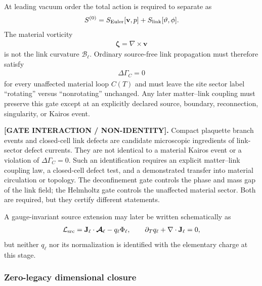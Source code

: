 At leading vacuum order the total action is required to separate as
\begin{align}
    S^{(0)}
    =
    S_{\rm Euler}[\mathbf v,p]
    +
    S_{\rm link}[\vartheta,\phi].
    \label{eq:rt_link_euler_factorization}
\end{align}
The material vorticity
\begin{align}
    \boldsymbol\zeta=\nabla\times\mathbf v
\end{align}
is not the link curvature
$\boldsymbol{\mathcal B}_\ell$.  Ordinary source-free link propagation must
therefore satisfy
\begin{align}
    \Delta\Gamma_C=0
\end{align}
for every unaffected material loop $C(T)$ and must leave the site sector label
``rotating'' versus ``nonrotating'' unchanged.  Any later matter--link coupling
must preserve this gate except at an explicitly declared source, boundary,
reconnection, singularity, or Kairos event.

\textbf{[GATE INTERACTION / NON-IDENTITY].}
Compact plaquette branch events and closed-cell link defects are candidate
microscopic ingredients of link-sector defect currents.  They are not identical
to a material Kairos event or a violation of \(\Delta\Gamma_C=0\).  Such an
identification requires an explicit matter--link coupling law, a closed-cell
defect test, and a demonstrated transfer into material circulation or topology.
The deconfinement gate controls the phase and mass gap of the link field; the
Helmholtz gate controls the unaffected material sector.  Both are required, but
they certify different statements.

A gauge-invariant source extension may later be written schematically as
\begin{align}
    \mathcal L_{\rm src}
    =
    \mathbf J_\ell\cdot\boldsymbol{\mathcal A}_\ell
    -
    q_\ell\Phi_\ell,
    \qquad
    \partial_Tq_\ell+\nabla\cdot\mathbf J_\ell=0,
    \label{eq:rt_link_source_extension}
\end{align}
but neither $q_\ell$ nor its normalization is identified with the elementary
charge at this stage.

\subsubsection{Zero-legacy dimensional closure}

